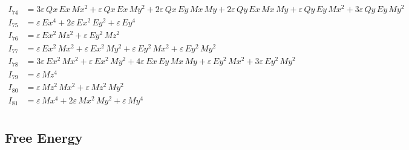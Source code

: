 \documentclass{article}
\begin{document}
\begin{align*}
I_{74} &= 3ε\,Qx\,Ex\,Mx^{2} + ε\,Qx\,Ex\,My^{2} + 2ε\,Qx\,Ey\,Mx\,My + 2ε\,Qy\,Ex\,Mx\,My + ε\,Qy\,Ey\,Mx^{2} + 3ε\,Qy\,Ey\,My^{2} \\
I_{75} &= ε\,Ex^{4} + 2ε\,Ex^{2}\,Ey^{2} + ε\,Ey^{4} \\
I_{76} &= ε\,Ex^{2}\,Mz^{2} + ε\,Ey^{2}\,Mz^{2} \\
I_{77} &= ε\,Ex^{2}\,Mx^{2} + ε\,Ex^{2}\,My^{2} + ε\,Ey^{2}\,Mx^{2} + ε\,Ey^{2}\,My^{2} \\
I_{78} &= 3ε\,Ex^{2}\,Mx^{2} + ε\,Ex^{2}\,My^{2} + 4ε\,Ex\,Ey\,Mx\,My + ε\,Ey^{2}\,Mx^{2} + 3ε\,Ey^{2}\,My^{2} \\
I_{79} &= ε\,Mz^{4} \\
I_{80} &= ε\,Mz^{2}\,Mx^{2} + ε\,Mz^{2}\,My^{2} \\
I_{81} &= ε\,Mx^{4} + 2ε\,Mx^{2}\,My^{2} + ε\,My^{4} \\
\end{align*}

\subsection*{Free Energy}
\end{document}

